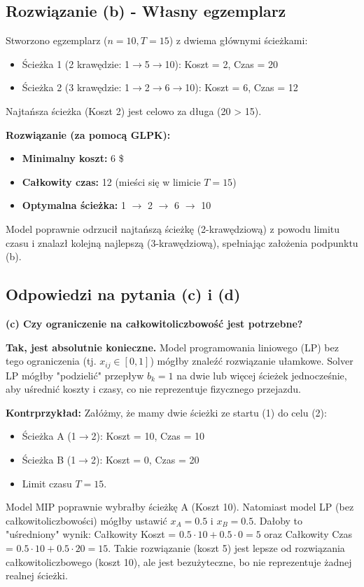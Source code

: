 \documentclass[11pt, a4paper]{article}
\begin{document}
\subsection{Rozwiązanie (b) - Własny egzemplarz}
Stworzono egzemplarz ($n=10, T=15$) z dwiema głównymi ścieżkami:
\begin{itemize}
    \item Ścieżka 1 (2 krawędzie: 1$\to$5$\to$10): Koszt = 2, Czas = 20
    \item Ścieżka 2 (3 krawędzie: 1$\to$2$\to$6$\to$10): Koszt = 6, Czas = 12
\end{itemize}
Najtańsza ścieżka (Koszt 2) jest celowo za długa (20 > 15).

\noindent \textbf{Rozwiązanie (za pomocą GLPK):}
\begin{itemize}
    \item \textbf{Minimalny koszt:} 6 \$
    \item \textbf{Całkowity czas:} 12 (mieści się w limicie $T=15$)
    \item \textbf{Optymalna ścieżka:} 1 $\to$ 2 $\to$ 6 $\to$ 10
\end{itemize}
Model poprawnie odrzucił najtańszą ścieżkę (2-krawędziową) z powodu limitu czasu i znalazł kolejną najlepszą (3-krawędziową), spełniając założenia podpunktu (b).

\subsection{Odpowiedzi na pytania (c) i (d)}

\noindent \textbf{(c) Czy ograniczenie na całkowitoliczbowość jest potrzebne?}

\textbf{Tak, jest absolutnie konieczne.} Model programowania liniowego (LP) bez tego ograniczenia (tj. $x_{ij} \in [0, 1]$) mógłby znaleźć rozwiązanie ułamkowe. Solver LP mógłby "podzielić" przepływ $b_k=1$ na dwie lub więcej ścieżek jednocześnie, aby uśrednić koszty i czasy, co nie reprezentuje fizycznego przejazdu.

\textbf{Kontrprzykład:} Załóżmy, że mamy dwie ścieżki ze startu (1) do celu (2):
\begin{itemize}
    \item Ścieżka A (1$\to$2): Koszt = 10, Czas = 10
    \item Ścieżka B (1$\to$2): Koszt = 0, Czas = 20
    \item Limit czasu $T = 15$.
\end{itemize}
Model MIP poprawnie wybrałby ścieżkę A (Koszt 10). Natomiast model LP (bez całkowitoliczbowości) mógłby ustawić $x_A = 0.5$ i $x_B = 0.5$. Dałoby to "uśredniony" wynik: Całkowity Koszt = $0.5 \cdot 10 + 0.5 \cdot 0 = 5$ oraz Całkowity Czas = $0.5 \cdot 10 + 0.5 \cdot 20 = 15$. Takie rozwiązanie (koszt 5) jest lepsze od rozwiązania całkowitoliczbowego (koszt 10), ale jest bezużyteczne, bo nie reprezentuje żadnej realnej ścieżki.
\end{document}

